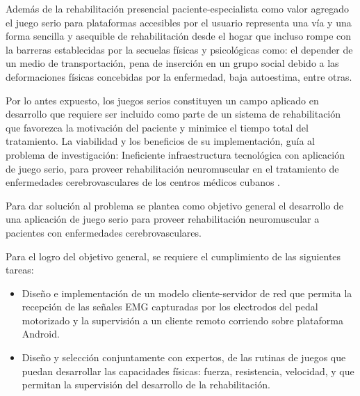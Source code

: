 \begin{introduction}
    \vspace{5pt}
    Además de la rehabilitación presencial paciente-especialista como valor 
    agregado el juego serio para plataformas accesibles por el usuario representa una vía y una forma
    sencilla y asequible de rehabilitación desde el hogar que incluso rompe con la barreras establecidas 
    por la secuelas físicas y psicológicas como: el depender de un medio de transportación, pena de inserción 
    en un grupo social debido a las deformaciones físicas concebidas por la enfermedad, baja autoestima, 
    entre otras.
    
    \vspace{5pt}
    Por lo antes expuesto, los juegos serios constituyen un campo aplicado en desarrollo que requiere ser incluido 
    como parte de un sistema de rehabilitación que favorezca la motivación del paciente y minimice el tiempo total 
    del tratamiento. La viabilidad y los beneficios de su implementación, guía al problema de investigación: 
    Ineficiente infraestructura tecnológica con aplicación de juego serio, para proveer rehabilitación neuromuscular en el tratamiento de
    enfermedades cerebrovasculares de los centros médicos cubanos . 

    \vspace{5pt}
    Para dar solución al problema se plantea como objetivo general el desarrollo de una
    aplicación de juego serio para proveer rehabilitación neuromuscular a pacientes con
    enfermedades cerebrovasculares.
    
    \vspace{5pt}
    Para el logro del objetivo general, se requiere el cumplimiento de las siguientes tareas:
    \begin{itemize}
        \item Diseño e implementación de un modelo cliente-servidor de red que permita la
        recepción de las señales EMG capturadas por los electrodos del pedal motorizado
        y la supervisión a un cliente remoto corriendo sobre plataforma Android.
        \item  Diseño y selección conjuntamente con expertos, de las rutinas de juegos que
        puedan desarrollar las capacidades físicas: fuerza, resistencia, velocidad, y que
        permitan la supervisión del desarrollo de la rehabilitación.
    \end{itemize}
\end{introduction}